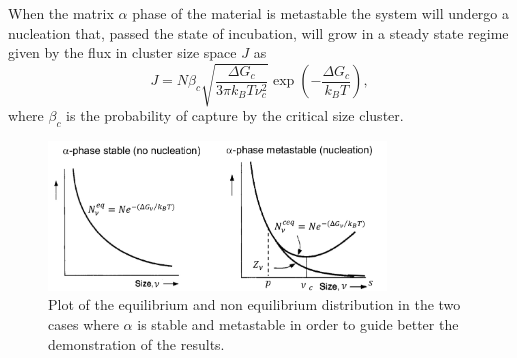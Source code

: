 {
    When the matrix $\alpha$ phase of the material is metastable the system will undergo a nucleation that, passed the state of incubation, will grow in a steady state regime given by the flux in cluster size space $J$ as
    \begin{equation}
        J = N\beta_c \sqrt{\frac{\Delta G_c}{3\pi k_BT\nu_c^2}}\exp\left( -\frac{\Delta G_c}{k_BT} \right),
    \end{equation}
    where $\beta_c$ is the probability of capture by the critical size cluster.
}
\begin{figure}[t]
    \centering
    \includegraphics[width=0.8\textwidth]{Immagini/DistributionsGrains.png}
    \caption
    {
        Plot of the equilibrium and non equilibrium distribution in the two cases where $\alpha$ is stable and metastable in order to guide better the demonstration of the results.
    }
    \label{fig:DistributionsGrains}
\end{figure}
